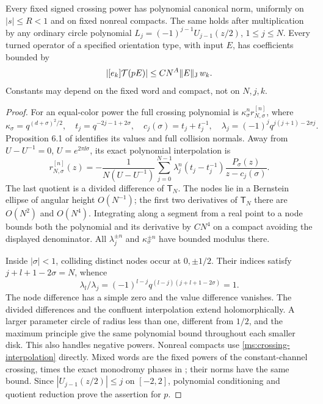 \begin{lemma}
\label{ms:coupon-bound}
Every fixed signed crossing power has polynomial canonical norm,
uniformly on $|s|\le R<1$ and on fixed nonreal compacts. The same
holds after multiplication by any ordinary circle polynomial
$L_j=(-1)^{j-1}U_{j-1}(z/2)$, $1\le j\le N$. Every turned
operator of a specified orientation type, with input $E$, has coefficients bounded by
\begin{equation}\label{ms:cone}
 |[e_k]\mathcal T(pE)|\le C N^A\lVert E\rVert_{\mathrm J}\,w_k.
\end{equation}
Constants may depend on the fixed word and compact, not on $N,j,k$.
\end{lemma}
\begin{proof}
For an equal-color power the full crossing polynomial is
$\kappa_\sigma^n r_{N,\sigma}^{[n]}$, where
\[
 \kappa_\sigma=q^{(d+\sigma)^2/2},\quad
 t_j=q^{-2j-1+2\sigma},\quad c_j(\sigma)=t_j+t_j^{-1},\quad
 \lambda_j=(-1)^jq^{j(j+1)-2\sigma j}.
\]
Proposition 6.1 of \cite{Meridian} identifies its values and full
collision normals. Away from $U-U^{-1}=0$, $U=e^{2\pi\ii\sigma}$,
its exact polynomial interpolation is
\begin{equation}\label{ms:crossing-interpolation}
 r_{N,\sigma}^{[n]}(z)=
 -\frac1{N(U-U^{-1})}\sum_{j=0}^{N-1}
 \lambda_j^n(t_j-t_j^{-1})\frac{P_\sigma(z)}{z-c_j(\sigma)}.
\end{equation}
The last quotient is a divided difference of $\mathsf T_N$.
The nodes lie in a Bernstein ellipse of angular height $O(N^{-1})$;
the first two derivatives of $\mathsf T_N$ there are $O(N^2)$ and
$O(N^4)$. Integrating along a segment from a real point to a node
bounds both the polynomial and its derivative by $C N^4$ on a
compact avoiding the displayed denominator. All $\lambda_j^{\pm n}$
and $\kappa_\sigma^{\pm n}$ have bounded modulus there.

Inside $|\sigma|<1$, colliding distinct nodes occur at
$0,\pm1/2$. Their indices satisfy $j+l+1-2\sigma=N$, whence
\[
 \lambda_l/\lambda_j=(-1)^{l-j}
 q^{(l-j)(j+l+1-2\sigma)}=1.
\]
The node difference has a simple zero and the value difference
vanishes. The divided differences and the confluent interpolation
extend holomorphically. A larger parameter circle of radius less
than one, different from $1/2$, and the maximum principle give the
same polynomial bound throughout each smaller disk. This also
handles negative powers. Nonreal compacts use
\eqref{ms:crossing-interpolation} directly. Mixed words are the
fixed powers of the constant-channel crossing, times the exact
monodromy phases in \cite[Section 8]{Meridian}; their norms have the
same bound. Since $|U_{j-1}(z/2)|\le j$ on $[-2,2]$, polynomial
conditioning and quotient reduction prove the assertion for $p$.


\end{proof}
